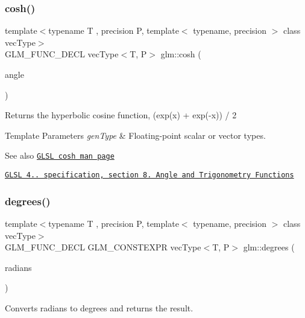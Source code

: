 \subsubsection{\texorpdfstring{cosh()}{cosh()}}
{\footnotesize\ttfamily template$<$typename T , precision P, template$<$ typename, precision $>$ class vec\+Type$>$ \\
G\+L\+M\+\_\+\+F\+U\+N\+C\+\_\+\+D\+E\+CL vec\+Type$<$T, P$>$ glm\+::cosh (\begin{DoxyParamCaption}\item[{vec\+Type$<$ T, P $>$ const \&}]{angle }\end{DoxyParamCaption})}

Returns the hyperbolic cosine function, (exp(x) + exp(-\/x)) / 2


\begin{DoxyTemplParams}{Template Parameters}
{\em gen\+Type} & Floating-\/point scalar or vector types.\\
\hline
\end{DoxyTemplParams}
\begin{DoxySeeAlso}{See also}
\href{http://www.opengl.org/sdk/docs/manglsl/xhtml/cosh.xml}{\tt G\+L\+SL cosh man page} 

\href{http://www.opengl.org/registry/doc/GLSLangSpec.4.20.8.pdf}{\tt G\+L\+SL 4.. specification, section 8. Angle and Trigonometry Functions} 
\end{DoxySeeAlso}
\mbox{\label{group__core__func__trigonometric_gabccdcc282134fd62af0ff3d6e4bb21f1}} 
\subsubsection{\texorpdfstring{degrees()}{degrees()}}
{\footnotesize\ttfamily template$<$typename T , precision P, template$<$ typename, precision $>$ class vec\+Type$>$ \\
G\+L\+M\+\_\+\+F\+U\+N\+C\+\_\+\+D\+E\+CL G\+L\+M\+\_\+\+C\+O\+N\+S\+T\+E\+X\+PR vec\+Type$<$T, P$>$ glm\+::degrees (\begin{DoxyParamCaption}\item[{vec\+Type$<$ T, P $>$ const \&}]{radians }\end{DoxyParamCaption})}

Converts radians to degrees and returns the result.



